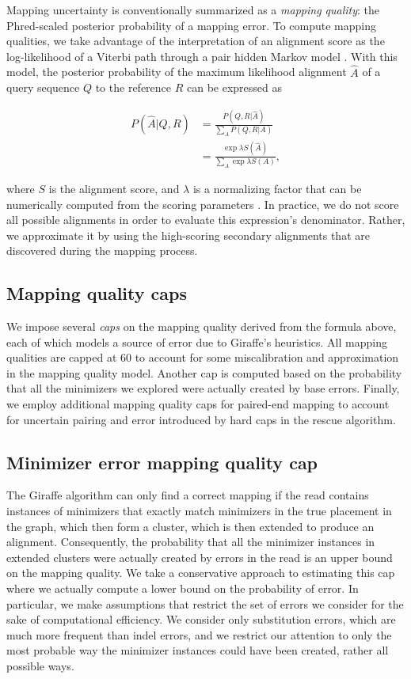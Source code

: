 \documentclass[11pt]{ucscthesis}
\newcommand{\vocab}[1]{\emph{#1}}
\begin{document}
Mapping uncertainty is conventionally summarized as a \vocab{mapping quality}: the Phred-scaled \cite{ewing1998base} posterior probability of a mapping error. To compute mapping qualities, we take advantage of the interpretation of an alignment score as the log-likelihood of a Viterbi path through a pair hidden Markov model \cite{durbin1998biological}. With this model, the posterior probability of the maximum likelihood alignment $\hat A$ of a query sequence $Q$ to the reference $R$ can be expressed as

\begin{align}
    P(\hat A| Q, R) &= \frac{P(Q, R | \hat A)}{\sum_A P(Q,R|A)} \nonumber \\
    &= \frac{\exp \lambda S(\hat A)}{\sum_A \exp \lambda S(A)}, \nonumber
\end{align}

\noindent where $S$ is the alignment score, and $\lambda$ is a normalizing factor that can be numerically computed from the scoring parameters \cite{karlin1990methods}. In practice, we do not score all possible alignments in order to evaluate this expression's denominator. Rather, we approximate it by using the high-scoring secondary alignments that are discovered during the mapping process.



\subsection{Mapping quality caps}

We impose several \vocab{caps} on the mapping quality derived from the formula above, each of which models a source of error due to Giraffe's heuristics.
All mapping qualities are capped at 60 to account for some miscalibration and approximation in the mapping quality model.
Another cap is computed based on the probability that all the minimizers we explored were actually created by base errors.
Finally, we employ additional mapping quality caps for paired-end mapping to account for uncertain pairing and error introduced by hard caps in the rescue algorithm.

\subsection{Minimizer error mapping quality cap}

The Giraffe algorithm can only find a correct mapping if the read contains instances of minimizers that exactly match minimizers in the true placement in the graph, which then form a cluster, which is then extended to produce an alignment. 
Consequently, the probability that all the minimizer instances in extended clusters were actually created by errors in the read is an upper bound on the mapping quality.
We take a conservative approach to estimating this cap where we actually compute a lower bound on the probability of error. 
In particular, we make assumptions that restrict the set of errors we consider for the sake of computational efficiency.
We consider only substitution errors, which are much more frequent than indel errors, and we restrict our attention to only the most probable way the minimizer instances could have been created, rather all possible ways. 
\end{document}
